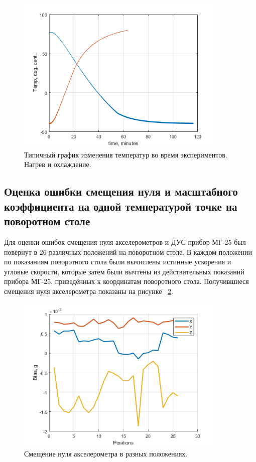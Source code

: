 \documentclass[a4paper,12pt]{article}
\begin{document}
\begin{figure}[hp!]
\centering
\includegraphics[width=0.9\textwidth]{temp_typical.png} 
\caption{\label{fig:temp_typical}  Типичный график изменения температур во время экспериментов. Нагрев и охлаждение.}
\end{figure}


\subsection{Оценка ошибки смещения нуля и масштабного коэффициента на одной температурой точке на поворотном столе}
Для оценки ошибок смещения нуля акселерометров и ДУС прибор МГ-25 был повёрнут в 26 различных положений на поворотном столе. В каждом положении по показаниям поворотного стола были вычислены истинные ускорения и угловые скорости, которые затем были вычтены из действительных показаний прибора МГ-25, приведённых к координатам поворотного стола. Получившиеся смещения нуля акселерометра показаны на рисунке  ~\ref{fig:accel_biases}.

\begin{figure}[hp!]
\centering
\includegraphics[width=0.9\textwidth]{accel_biases.png} 
\caption{\label{fig:accel_biases}  Смещение нуля акселерометра в разных положениях.}
\end{figure}
\end{document}
